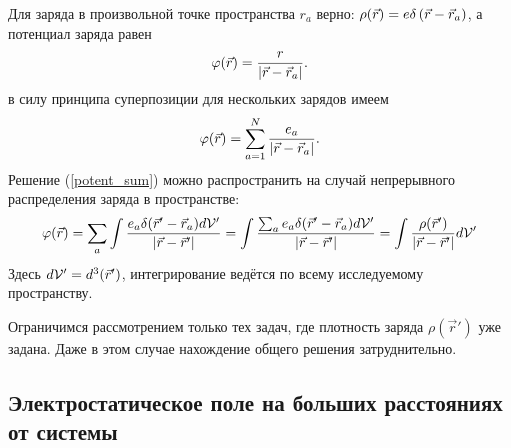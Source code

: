     Для заряда в произвольной точке пространства $r_a$ верно: $\rho(\vec{r}) = e\delta\left({\vec{r} - \vec{r}_a}\right)$, а потенциал заряда равен
    \[
        \varphi(\vec{r}) = \frac{r}{\left|{\vec{r} - \vec{r}_a}\right|}.
    \]
    в силу принципа суперпозиции для нескольких зарядов имеем
    \begin{equation}
        \varphi(\vec{r}) = \sum_{a=1}^N \frac{e_a}{\left|{\vec{r} - \vec{r}_a}\right|}. \label{potent_sum}
    \end{equation}
    Решение (\ref{potent_sum}) можно распространить на случай непрерывного распределения заряда в пространстве:
    \[
        \varphi(\vec{r}) = \sum_a \int \frac{e_a\delta(\vec{r}' - \vec{r}_a)d \mathcal{V} '}{\left|{\vec{r} - \vec{r}'}\right|} = \int \frac{\sum_a e_a\delta(\vec{r}' - \vec{r}_a)d \mathcal{V} '}{\left|{\vec{r} - \vec{r}'}\right|} =
        \int \frac{\rho(\vec{r}')}{\left|{\vec{r} - \vec{r}'}\right|} d\mathcal{V}'
    \]
    Здесь $d\mathcal{V}' = d^3(\vec{r}')$, интегрирование ведётся по всему исследуемому пространству.

    Ограничимся рассмотрением только тех задач, где плотность заряда $\rho(\vec{r}')$ уже задана. Даже в этом случае нахождение общего решения затруднительно.

\subsection{Электростатическое поле на больших расстояниях от системы}
    \begin{figure}[h]
        \centering{
            
        }
    \end{figure}

